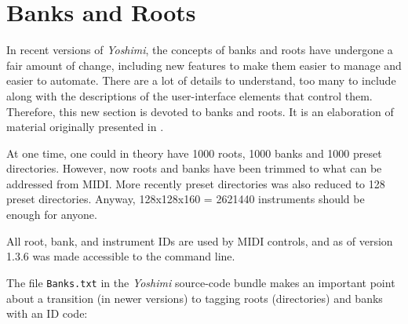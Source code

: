 %
%
%

\section{Banks and Roots}
\label{sec:banks_and_roots}

   In recent versions of \textsl{Yoshimi}, the concepts of banks and roots
   have undergone a fair amount of change, including new features to make
   them easier to manage and easier to automate.  There are a lot of details
   to understand, too many to include along with the descriptions of the
   user-interface elements that control them.
   Therefore, this new section is devoted to banks and roots.
   It is an elaboration of material originally presented in
   .

   At one time, one could in theory have 1000 roots, 1000 banks and 1000
   preset directories.  However, now roots and banks have been trimmed to what
   can be addressed from MIDI. More recently preset directories was also reduced
   to 128 preset directories.
   Anyway, 128x128x160 = 2621440 instruments should be enough for anyone.

   All root, bank, and instrument IDs are used by MIDI controls, and as of
   version 1.3.6 was made accessible to the command line.

   The file \texttt{Banks.txt} in the \textsl{Yoshimi} source-code bundle
   makes an important point about a transition (in newer versions)
   to tagging roots (directories) and banks with an ID code:

